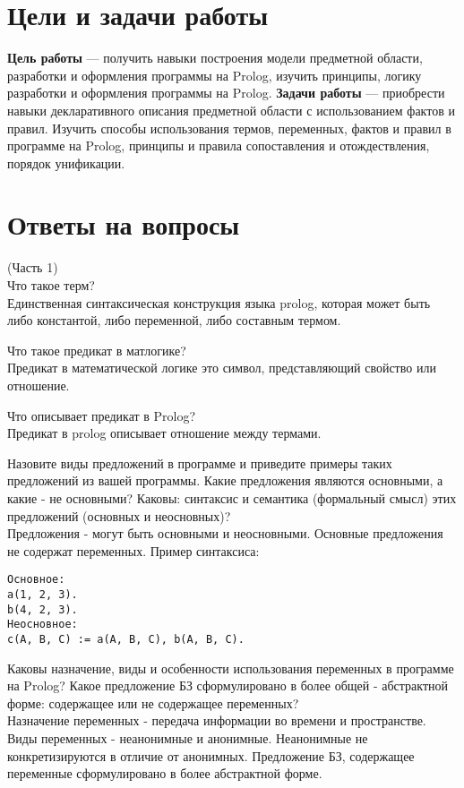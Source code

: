 \chapter{Цели и задачи работы}
\textbf{Цель работы} --- получить навыки построения модели предметной области, разработки и оформления программы на Prolog, изучить принципы, логику  разработки и оформления программы на Prolog.
\textbf{Задачи работы} --- приобрести навыки декларативного описания предметной области с использованием фактов и правил. Изучить способы использования термов, переменных, фактов и правил в программе на Prolog, принципы и правила сопоставления и отождествления, порядок унификации.

\chapter{Ответы на вопросы}
(Часть 1)\\
Что такое терм?\\
Единственная синтаксическая конструкция языка prolog, которая может быть либо константой, либо переменной, либо составным термом.

Что такое предикат в матлогике?\\
Предикат в математической логике это символ, представляющий свойство или отношение.

Что описывает предикат в Prolog?\\
Предикат в prolog описывает отношение между термами.

Назовите виды предложений в программе и приведите примеры таких предложений из вашей программы. Какие предложения являются основными, а какие - не основными? Каковы: синтаксис и семантика (формальный смысл) этих предложений (основных и неосновных)?\\
Предложения - могут быть основными и неосновными. Основные предложения не содержат переменных. Пример синтаксиса:\\
\begin{lstlisting}
Основное:
a(1, 2, 3).
b(4, 2, 3).
Неосновное:
c(A, B, C) := a(A, B, C), b(A, B, C).
\end{lstlisting}

Каковы назначение, виды и особенности использования переменных в программе на Prolog? Какое предложение БЗ сформулировано в более общей - абстрактной форме: содержащее или не содержащее переменных?\\
Назначение переменных - передача информации во времени и пространстве. Виды переменных - неанонимные и анонимные. Неанонимные не конкретизируются в отличие от анонимных. Предложение БЗ, содержащее переменные сформулировано в более абстрактной форме.

